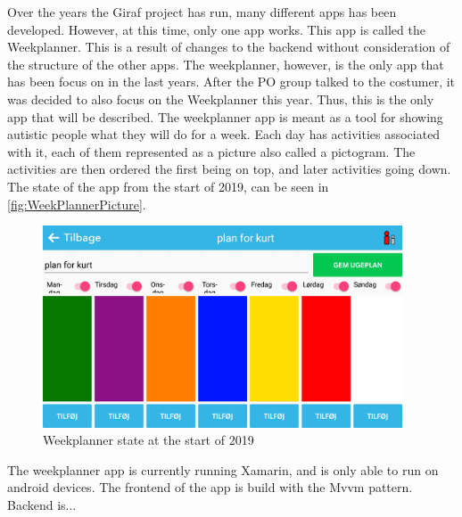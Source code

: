 \par \noindent
Over the years the Giraf project has run, many different apps has been developed. However, at this time, only one app works. This app is called the Weekplanner. This is a result of changes to the backend without consideration of the structure of the other apps\cite{AppsStatus2019}. 
The weekplanner, however, is the only app that has been focus on in the last years. After the \gls{PO} group talked to the costumer, it was decided to also focus on the Weekplanner this year. Thus, this is the only app that will be described.  \newline
The weekplanner app is meant as a tool for showing autistic people what they will do for a week. Each day has activities associated with it, each of them represented as a picture also called a pictogram. The activities are then ordered the first being on top, and later activities going down. The state of the app from the start of 2019, can be seen in \autoref{fig:WeekPlannerPicture}.

\begin{figure}[ht]
        \begin{center}
            \includegraphics[width=0.95\textwidth]{figures/WeekPlannerPicture}
        \end{center}
        \caption{Weekplanner state at the start of 2019}
        \label{fig:WeekPlannerPicture}
\end{figure}

\noindent
The weekplanner app is currently running Xamarin, and is only able to run on android devices. The frontend of the app is build with the \gls{Mvvm} pattern. 
Backend is... %
